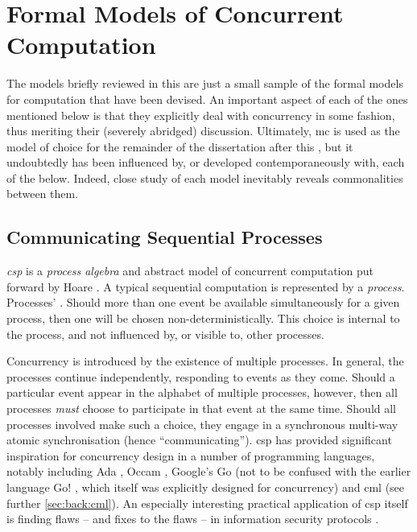 \section{\label{sec:back:formalmodels}Formal Models of Concurrent Computation}
The models briefly reviewed in this  are just a small sample of the formal models for computation that have been devised.  An important aspect of each of the ones mentioned below is that they explicitly deal with concurrency in some fashion, thus meriting their (severely abridged) discussion.  Ultimately, \gls{mc} is used as the model of choice for the remainder of the dissertation after this , but it undoubtedly has been influenced by, or developed contemporaneously with, each of the below.  Indeed, close study of each model inevitably reveals commonalities between them.

\subsection{\label{subsec:back:csp}Communicating Sequential Processes}

\emph{\Gls{csp}} is a \emph{process algebra} and abstract model of concurrent computation put forward by Hoare \cite{Hoare1985,Roscoe2011}.  A typical sequential computation is represented by a \emph{process}.  Processes' .  Should more than one event be available simultaneously for a given process, then one will be chosen non-deterministically.  This choice is internal to the process, and not influenced by, or visible to, other processes.

Concurrency is introduced by the existence of multiple processes.  In general, the processes continue independently, responding to events as they come.  Should a particular event appear in the alphabet of multiple processes, however, then all processes \emph{must} choose to participate in that event at the same time.  Should all processes involved make such a choice, they engage in a synchronous multi-way atomic synchronisation (hence ``communicating'').  \Gls{csp} has provided significant inspiration for concurrency design in a number of programming languages, notably including Ada \cite{Defense1983,Taft2013}, Occam \cite{Elizabeth1987}, Google's Go \cite{Meyerson2014} (not to be confused with the earlier language Go! \cite{Clark2004}, which itself was explicitly designed for concurrency) and \gls{cml} \cite{Reppy2011} (see further \vref{sec:back:cml}).  An especially interesting practical application of \gls{csp} itself is finding flaws -- and fixes to the flaws -- in information security protocols \cite{Roscoe1995,Lowe1996,Koltuksuz2010}.

